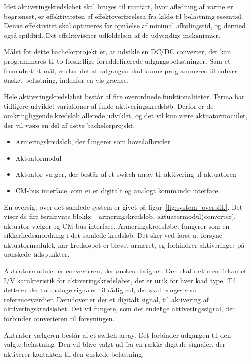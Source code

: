 Idet aktiveringskredsløbet skal bruges til rumfart, hvor afledning af varme er begrænset, er effektiviteten af effektoverførelsen fra kilde til belastning essentiel. Denne effektivitet skal optimeres for opnåelse af minimal afkølingstid, og dermed også spildtid. Det effektiviserer udfoldelsen af de udvendige mekanismer\cite{projekt-oplag}. 

Målet for dette bachelorprojekt er, at udvikle en DC/DC converter, der kan programmeres til to forskellige foruddefinerede udgangsbelastninger. Som et fremadrettet mål, ønskes det at udgangen skal kunne programmeres til enhver ønsket belastning, indenfor en vis grænse. 

Hele aktiveringskredsløbet består af fire overordnede funktionaliteter. Terma har tidligere udviklet variationer af fulde aktiveringskredsløb. Derfor er de omkringliggende kredsløb allerede udviklet, og det vil kun være aktuatormodulet, der vil være en del af dette bachelorprojekt.
\begin{itemize}
	\item Armeringskredsløb, der fungerer som hovedafbryder
	\item Aktuatormodul
	\item Aktuator-vælger, der består af et switch array til aktivering af aktuatoren
	\item CM-bus interface, som er et digitalt og analogt kommando interface
\end{itemize}

\noindent En oversigt over det samlede system er givet på figur~\ref{fig:system_overblik}. Det viser de fire førnævnte blokke - armeringskredsløb, aktuatormodul(converter), aktuator-vælger og CM-bus interface. Armeringskredsløbet fungerer som en sikkerhedsanordning i det samlede kredsløb. Det sker ved først at forsyne aktuatormodulet, når kredsløbet er blevet armeret, og forhindrer aktiveringer på uønskede tidspunkter. 

Aktuatormodulet er converteren, der ønskes designet. Den skal sætte en firkantet I/V karakteristik for aktiveringskredsløbet, der er unik for hver load type. Til dette er der to analoge signaler til rådighed, der skal bruges som referenceværdier. Derudover er der et digitalt signal, til aktivering af aktiveringskredsløbet. Det vil fungere, som det endelige aktiveringssignal, der forbinder converteren til forsyningen. 

Aktuator-vælgeren består af et switch-array. Det forbinder udgangen til den valgte belastning. Den vil blive valgt ud fra en række digitale signaler, der aktiverer kontakten til den ønskede belastning.

